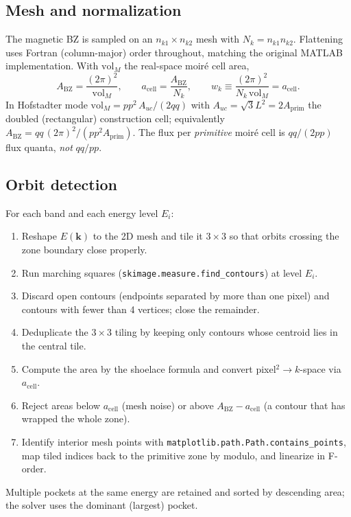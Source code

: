 \documentclass[11pt]{article}
\newcommand{\BZ}{\mathrm{BZ}}
\newcommand{\Nk}{N_k}
\newcommand{\kb}{\mathbf{k}}
\newcommand{\code}[1]{\texttt{#1}}
\begin{document}
\subsection{Mesh and normalization}

The magnetic BZ is sampled on an $n_{k1}\times n_{k2}$ mesh with
$\Nk = n_{k1}n_{k2}$.  Flattening uses Fortran (column-major) order
throughout, matching the original MATLAB implementation.  With
$\mathrm{vol}_M$ the real-space moir\'e cell area,
\begin{equation}
  A_\BZ = \frac{(2\pi)^2}{\mathrm{vol}_M},
  \qquad
  a_{\text{cell}} = \frac{A_\BZ}{\Nk},
  \qquad
  w_k \equiv \frac{(2\pi)^2}{\Nk\,\mathrm{vol}_M} = a_{\text{cell}} .
\end{equation}
In Hofstadter mode $\mathrm{vol}_M = pp^2\,A_{uc}/(2qq)$ with
$A_{uc} = \sqrt{3}L^2 = 2A_{\text{prim}}$ the doubled (rectangular)
construction cell; equivalently
$A_\BZ = qq\,(2\pi)^2/(pp^2 A_{\text{prim}})$.  The flux per
\emph{primitive} moir\'e cell is $qq/(2pp)$ flux quanta, \emph{not}
$qq/pp$.

\subsection{Orbit detection}

For each band and each energy level $E_i$:
\begin{enumerate}
\item Reshape $E(\kb)$ to the 2D mesh and tile it $3\times 3$ so that
  orbits crossing the zone boundary close properly.
\item Run marching squares (\code{skimage.measure.find\_contours}) at
  level $E_i$.
\item Discard open contours (endpoints separated by more than one pixel)
  and contours with fewer than 4 vertices; close the remainder.
\item Deduplicate the $3\times3$ tiling by keeping only contours whose
  centroid lies in the central tile.
\item Compute the area by the shoelace formula and convert
  pixel$^2 \to k$-space via $a_{\text{cell}}$.
\item Reject areas below $a_{\text{cell}}$ (mesh noise) or above
  $A_\BZ - a_{\text{cell}}$ (a contour that has wrapped the whole zone).
\item Identify interior mesh points with
  \code{matplotlib.path.Path.contains\_points}, map tiled indices back
  to the primitive zone by modulo, and linearize in F-order.
\end{enumerate}
Multiple pockets at the same energy are retained and sorted by
descending area; the solver uses the dominant (largest) pocket.
\end{document}
